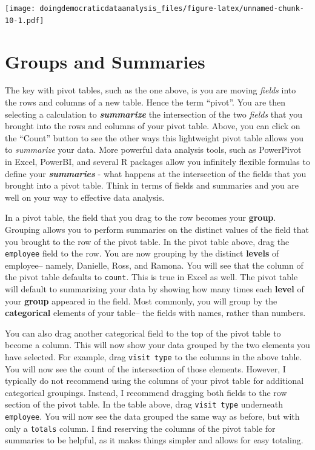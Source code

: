 \documentclass[
]{book}
\begin{document}
\texttt{[image: doingdemocraticdataanalysis\_files/figure-latex/unnamed-chunk-10-1.pdf]}

\hypertarget{groups-and-summaries}{%
\section{Groups and Summaries}\label{groups-and-summaries}}

The key with pivot tables, such as the one above, is you are moving \emph{fields} into the rows and columns of a new table. Hence the term ``pivot''. You are then selecting a calculation to \textbf{\emph{summarize}} the intersection of the two \emph{fields} that you brought into the rows and columns of your pivot table. Above, you can click on the ``Count'' button to see the other ways this lightweight pivot table allows you to \emph{summarize} your data. More powerful data analysis tools, such as PowerPivot in Excel, PowerBI, and several R packages allow you infinitely flexible formulas to define your \textbf{\emph{summaries}} - what happens at the intersection of the fields that you brought into a pivot table. Think in terms of fields and summaries and you are well on your way to effective data analysis.

In a pivot table, the field that you drag to the row becomes your \textbf{group}. Grouping allows you to perform summaries on the distinct values of the field that you brought to the row of the pivot table. In the pivot table above, drag the \texttt{employee} field to the row. You are now grouping by the distinct \textbf{levels} of employee-- namely, Danielle, Ross, and Ramona. You will see that the column of the pivot table defaults to \texttt{count}. This is true in Excel as well. The pivot table will default to summarizing your data by showing how many times each \textbf{level} of your \textbf{group} appeared in the field. Most commonly, you will group by the \textbf{categorical} elements of your table-- the fields with names, rather than numbers.

You can also drag another categorical field to the top of the pivot table to become a column. This will now show your data grouped by the two elements you have selected. For example, drag \texttt{visit\ type} to the columns in the above table. You will now see the count of the intersection of those elements. However, I typically do not recommend using the columns of your pivot table for additional categorical groupings. Instead, I recommend dragging both fields to the row section of the pivot table. In the table above, drag \texttt{visit\ type} underneath \texttt{employee}. You will now see the data grouped the same way as before, but with only a \texttt{totals} column. I find reserving the columns of the pivot table for summaries to be helpful, as it makes things simpler and allows for easy totaling.
\end{document}
